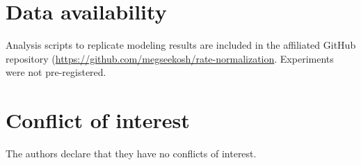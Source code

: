 \section*{Data availability}
Analysis scripts to replicate modeling results are included in the affiliated GitHub repository (\url{https://github.com/megseekosh/rate-normalization}. Experiments were not pre-registered.

\section*{Conflict of interest}
The authors declare that they have no conflicts of interest.






